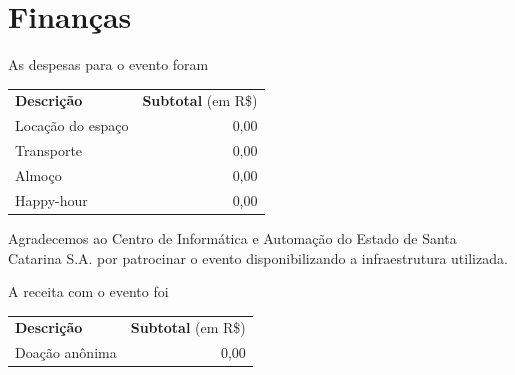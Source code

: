 \documentclass[12pt]{article}
\begin{document}
\newpage

\section*{Finanças}

As despesas para o evento foram

\begin{tabular}{p{}r}
  \textbf{Descrição} & \textbf{Subtotal} (em R\$) \\
  Locação do espaço & 0,00 \\
  Transporte & 0,00 \\ %
  Almoço & 0,00 \\ %
  Happy-hour & 0,00 \\ %
\end{tabular}

Agradecemos ao Centro de Informática e Automação do Estado de Santa Catarina
S.A. por patrocinar o evento disponibilizando a infraestrutura utilizada.

A receita com o evento foi

\begin{tabular}{p{}r}
  \textbf{Descrição} & \textbf{Subtotal} (em R\$) \\
  Doação anônima & 0,00 \\
\end{tabular}
\end{document}
